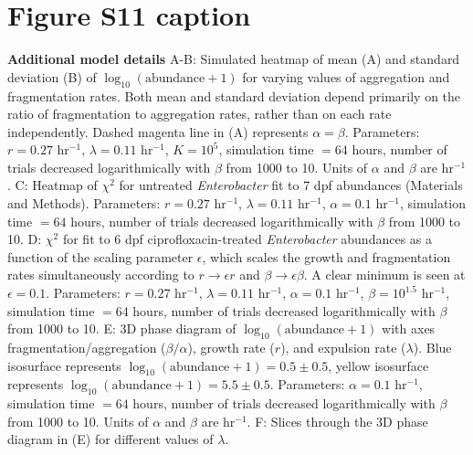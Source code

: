 \section*{Figure S11 caption}
\textbf{Additional model details}  A-B: Simulated heatmap of mean (A) and standard deviation (B) of $\log_{10}(\text{abundance} + 1)$ for varying values of aggregation and fragmentation rates. Both mean and standard deviation depend primarily on the ratio of fragmentation to aggregation rates, rather than on each rate independently. Dashed magenta line in (A) represents $\alpha = \beta$. Parameters: $r = 0.27$ hr$^{-1}$, $\lambda = 0.11$ hr$^{-1}$, $K = 10^5$, simulation time $= 64$ hours, number of trials decreased logarithmically with $\beta$ from 1000 to 10. Units of $\alpha$ and $\beta$ are hr$^{-1}$.  C: Heatmap of $\chi^2$ for untreated \textit{Enterobacter} fit to 7 dpf abundances (Materials and Methods). Parameters: $r = 0.27$ hr$^{-1}$, $\lambda = 0.11$ hr$^{-1}$, $\alpha = 0.1$ hr$^{-1}$, simulation time $= 64$ hours, number of trials decreased logarithmically with $\beta$ from 1000 to 10. D:   $\chi^2$ for fit to 6 dpf ciprofloxacin-treated \textit{Enterobacter} abundances as a function of the scaling parameter $\epsilon$, which scales the growth and fragmentation rates simultaneously according to $r \to \epsilon r$ and $\beta \to \epsilon \beta$. A clear minimum is seen at $\epsilon = 0.1$. Parameters: $r = 0.27$ hr$^{-1}$, $\lambda = 0.11$ hr$^{-1}$, $\alpha = 0.1$ hr$^{-1}$, $\beta = 10^{1.5}$ hr$^{-1}$, simulation time $= 64$ hours, number of trials decreased logarithmically with $\beta$ from 1000 to 10. E: 3D phase diagram of $\log_{10}(\text{abundance} + 1)$ with axes fragmentation/aggregation ($\beta/\alpha$), growth rate ($r$), and expulsion rate ($\lambda$). Blue isosurface represents $\log_{10}(\text{abundance} + 1) = 0.5 \pm 0.5$, yellow isosurface represents  $\log_{10}(\text{abundance} + 1) = 5.5 \pm 0.5$. Parameters: $\alpha = 0.1$ hr$^{-1}$, simulation time $= 64$ hours, number of trials decreased logarithmically with $\beta$ from 1000 to 10. Units of $\alpha$ and $\beta$ are hr$^{-1}$. F: Slices through the 3D phase diagram in (E) for different values of $\lambda$.

